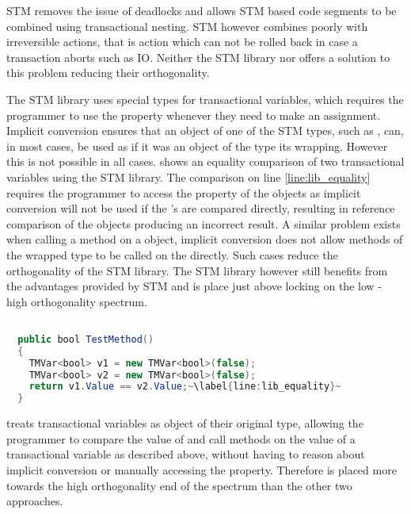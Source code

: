 \ac{STM} removes the issue of deadlocks and allows \ac{STM} based code segments to be combined using transactional nesting. \ac{STM} however combines poorly with irreversible actions, that is action which can not be rolled back in case a transaction aborts such as \ac{IO}. Neither the \ac{STM} library nor \stmnamesp offers a solution to this problem reducing their orthogonality. 

The \ac{STM} library uses special types for transactional variables, which requires the programmer to use the  property whenever they need to make an assignment. Implicit conversion ensures that an object of one of the \ac{STM} types, such as , can, in most cases, be used as if it was an object of the type its wrapping. However this is not possible in all cases.  shows an equality comparison of two transactional variables using the \ac{STM} library. The comparison on line \ref{line:lib_equality} requires the programmer to access the  property of the  objects as implicit conversion will not be used if the 's are compared directly, resulting in reference comparison of the  objects producing an incorrect result. A similar problem exists when calling a method on a  object, implicit conversion does not allow methods of the wrapped type to be called on the  directly. Such cases reduce the orthogonality of the \ac{STM} library. The \ac{STM} library however still benefits from the advantages provided by \ac{STM} and is place just above locking on the low - high orthogonality spectrum.

\begin{lstlisting}[label=lst:lib_implicit_conversion,
  caption={Equality comparison of \bscode{TMVar<bool>}},
  language=Java,  
  showspaces=false,
  showtabs=false,
  breaklines=true,
  showstringspaces=false,
  breakatwhitespace=true,
  escapechar=~,
  commentstyle=\color{greencomments},
  keywordstyle=\color{bluekeywords},
  stringstyle=\color{redstrings},
  morekeywords={atomic, retry, orelse, var, get, set, ref, out, bool}]  % Start your code-block

  public bool TestMethod()
  {
    TMVar<bool> v1 = new TMVar<bool>(false);
    TMVar<bool> v2 = new TMVar<bool>(false);
    return v1.Value == v2.Value;~\label{line:lib_equality}~
  }
\end{lstlisting}
\stmnamesp treats transactional variables as object of their original type, allowing the programmer to compare the value of and call methods on  the value of a transactional variable as described above, without having to reason about implicit conversion or manually accessing the  property. Therefore \stmname is placed more towards the high orthogonality end of the spectrum than the other two approaches. 

